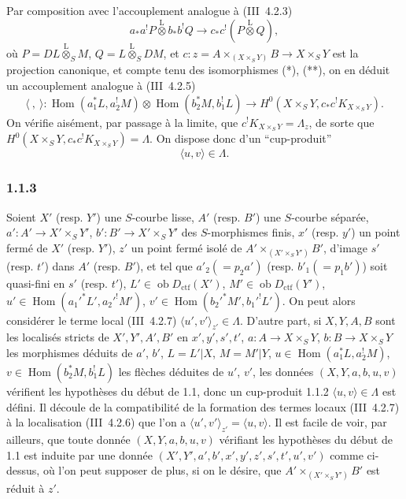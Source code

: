 \documentclass[11pt]{article}
\DeclareMathOperator{\Hom}{Hom}
\newcommand{\ob}{\operatorname{ob}}
\providecommand{\ctf}{\mathrm{ctf}}
\providecommand{\lten}{\overset{\mathrm L}{\otimes}}
\providecommand{\Hom}{\operatorname{Hom}}
\providecommand{\ob}{\operatorname{ob}}
\providecommand{\lten}{\overset{\mathrm L}{\otimes}}
\providecommand{\lten}{\overset{\mathrm L}{\otimes}}
\providecommand{\lten}{\overset{\mathrm L}{\otimes}}
\providecommand{\lten}{\overset{\mathrm L}{\otimes}}
\providecommand{\lten}{\overset{\mathrm L}{\otimes}}
\providecommand{\Hom}{\operatorname{Hom}}
\providecommand{\lten}{\overset{\mathrm L}{\otimes}}
\begin{document}
Par composition avec l'accouplement analogue à (III~4.2.3)
\[
a_*a^!P\lten b_*b^!Q\longrightarrow c_*c^!(P\lten Q),
\]
où $P=DL\lten_SM$, $Q=L\lten_SDM$, et $c:z=A\times_{(X\times_S Y)}B\to X\times_S Y$ est la projection canonique, et compte tenu des isomorphismes (*), (**), on en déduit un accouplement analogue à (III~4.2.5)
\[
\langle\ ,\ \rangle:\Hom(a_1^*L,a_2^!M)\otimes\Hom(b_2^*M,b_1^!L)
\longrightarrow H^0(X\times_S Y,c_*c^!K_{X\times_S Y}).
\]
On vérifie
aisément, par passage à la limite, que $c^!K_{X\times_S Y}=\Lambda_z$, de sorte que $H^0(X\times_S Y,c_*c^!K_{X\times_S Y})=\Lambda$. On dispose donc d'un ``cup-produit''
\begin{equation}\tag{1.1.2}
\langle u,v\rangle\in\Lambda.
\end{equation}

\subsubsection*{1.1.3}
Soient $X'$ (resp. $Y'$) une $S$-courbe lisse, $A'$ (resp. $B'$) une $S$-courbe séparée, $a':A'\longrightarrow X'\times_S Y'$, $b':B'\longrightarrow X'\times_S Y'$ des $S$-morphismes finis, $x'$ (resp. $y'$) un point fermé de $X'$ (resp. $Y'$), $z'$ un point fermé isolé de $A'\times_{(X'\times_S Y')}B'$, d'image $s'$ (resp. $t'$) dans $A'$ (resp. $B'$), et tel que $a'_2(=p_2a')$ (resp. $b'_1(=p_1b')$) soit quasi-fini en $s'$ (resp. $t'$), $L'\in\ob D_{\ctf}(X')$, $M'\in\ob D_{\ctf}(Y')$, $u'\in\Hom(a_1'^*L',a_2'^!M')$, $v'\in\Hom(b_2'^*M',b_1'^!L')$. On peut alors considérer le terme local (III~4.2.7) $\langle u',v'\rangle_{z'}\in\Lambda$. D'autre part, si $X,Y,A,B$ sont les localisés stricts de $X',Y',A',B'$ en $x',y',s',t'$, $a:A\to X\times_S Y$, $b:B\to X\times_SY$ les morphismes déduits de $a'$, $b'$, $L=L'|X$, $M=M'|Y$, $u\in\Hom(a_1^*L,a_2^!M)$, $v\in\Hom(b_2^*M,b_1^!L)$ les flèches déduites de $u'$, $v'$, les données $(X,Y,a,b,u,v)$ vérifient les hypothèses du début de 1.1, donc un cup-produit 1.1.2 $\langle u,v\rangle\in\Lambda$ est défini. Il découle de la compatibilité de la formation des termes locaux (III~4.2.7) à la localisation (III~4.2.6) que l'on a $\langle u',v'\rangle_{z'}=\langle u,v\rangle$. Il est facile de voir, par ailleurs, que toute donnée $(X,Y,a,b,u,v)$ vérifiant les hypothèses du début de 1.1 est induite par une donnée $(X',Y',a',b',x',y',z',s',t',u',v')$ comme ci-dessus, où l'on peut supposer de plus, si on le désire, que $A'\times_{(X'\times_S Y')}B'$ est réduit à $z'$.
\end{document}
